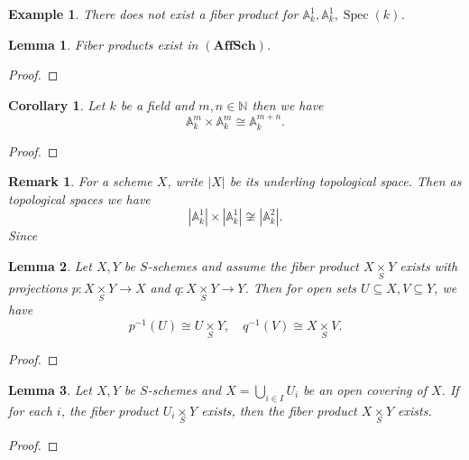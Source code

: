 \documentclass{article}
\newtheorem{lemma}{Lemma}[section]
\newtheorem{remark}{Remark}[section]
\newtheorem{corollary}{Corollary}[section]
\newtheorem{example}{Example}[section]
\numberwithin{equation}{section}
\DeclareMathOperator{\Spec}{Spec}
\newcommand{\fib}[1]{%
  \mathbin{\mathop{\times}\limits_{#1}}%
}
\begin{document}
\begin{example}
There does not exist a fiber product for $\mathbb{A}_k^1,\mathbb{A}_k^1,\Spec(k)$. %
\end{example}

\begin{lemma}
Fiber products exist in $(\mathbf{AffSch})$. 
\label{fiber_product_affine_scheme}
\end{lemma}
\begin{proof}
\end{proof}

\begin{corollary}
Let $k$ be a field and $m,n\in\mathbb{N}$ then we have
\begin{equation*}
\mathbb{A}^m_k\times \mathbb{A}^m_k \cong\mathbb{A}^{m+n}_k.
\end{equation*}
\end{corollary}

\begin{proof}
\end{proof}

\begin{remark}
For a scheme $X$, write $|X|$ be its underling topological space. Then as topological spaces we have
\begin{equation*}
|\mathbb{A}^1_k|\times| \mathbb{A}^1_k|\not\cong|\mathbb{A}^{2}_k|.
\end{equation*}
Since %
\end{remark}

\begin{lemma}
Let $X,Y$ be $S$-schemes and assume the fiber product $X\fib{S}Y$ exists with projections $p:X\fib{S}Y\to X$ and $q:X\fib{S}Y\to Y$. Then for open sets $U\subseteq X, V\subseteq Y$, we have
\begin{equation*}
p^{-1}(U)\cong U\fib{S}Y,\quad q^{-1}(V)\cong X\fib{S}V.
\end{equation*}
\end{lemma}
\begin{proof}
\end{proof}

\begin{lemma}
Let $X,Y$ be $S$-schemes and $X=\bigcup_{i\in I}U_i$ be an open covering of $X$. If for each $i$, the fiber product $U_i\fib{S}Y$ exists, then the fiber product $X\fib{S}Y$ exists.
\label{sheaf_property_fiber_product}
\end{lemma}

\begin{proof}
\end{proof}
\end{document}
